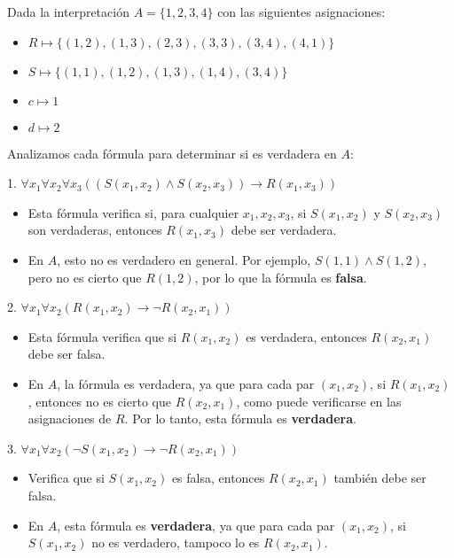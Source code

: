 \begin{solution}
Dada la interpretación \( A = \{1, 2, 3, 4\} \) con las siguientes asignaciones:
\begin{itemize}
    \item $R \mapsto \{(1, 2), (1, 3), (2, 3), (3, 3), (3, 4), (4, 1)\}$
    \item $S \mapsto \{(1, 1), (1, 2), (1, 3), (1, 4), (3, 4)\}$
    \item $c \mapsto 1$
    \item $d \mapsto 2$
\end{itemize}

Analizamos cada fórmula para determinar si es verdadera en $A$:

1. \(\forall x_1 \forall x_2 \forall x_3 ((S(x_1, x_2) \land S(x_2, x_3)) \to R(x_1, x_3))\)

\begin{itemize}
    \item Esta fórmula verifica si, para cualquier \( x_1, x_2, x_3 \), si \( S(x_1, x_2) \) y \( S(x_2, x_3) \) son verdaderas, entonces \( R(x_1, x_3) \) debe ser verdadera.
    \item En $A$, esto no es verdadero en general. Por ejemplo, \( S(1, 1) \land S(1, 2) \), pero no es cierto que \( R(1, 2) \), por lo que la fórmula es \textbf{falsa}.
\end{itemize}

2. \(\forall x_1 \forall x_2 (R(x_1, x_2) \to \neg R(x_2, x_1))\)

\begin{itemize}
    \item Esta fórmula verifica que si \( R(x_1, x_2) \) es verdadera, entonces \( R(x_2, x_1) \) debe ser falsa.
    \item En $A$, la fórmula es verdadera, ya que para cada par \( (x_1, x_2) \), si \( R(x_1, x_2) \), entonces no es cierto que \( R(x_2, x_1) \), como puede verificarse en las asignaciones de $R$. Por lo tanto, esta fórmula es \textbf{verdadera}.
\end{itemize}

3. \(\forall x_1 \forall x_2 (\neg S(x_1, x_2) \to \neg R(x_2, x_1))\)

\begin{itemize}
    \item Verifica que si \( S(x_1, x_2) \) es falsa, entonces \( R(x_2, x_1) \) también debe ser falsa.
    \item En $A$, esta fórmula es \textbf{verdadera}, ya que para cada par \( (x_1, x_2) \), si \( S(x_1, x_2) \) no es verdadero, tampoco lo es \( R(x_2, x_1) \).
\end{itemize}


\end{solution}
